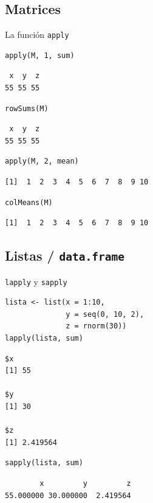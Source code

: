 \documentclass[xcolor={usenames,svgnames,dvipsnames}]{beamer}
\begin{document}
\subsection{Matrices}
\label{sec-4-1}
\begin{frame}[fragile,label=sec-4-1-1]{La función \texttt{apply}}
 \lstset{language=R,label= ,caption= ,numbers=none}
\begin{lstlisting}
apply(M, 1, sum)
\end{lstlisting}

\begin{verbatim}
 x  y  z 
55 55 55
\end{verbatim}

\lstset{language=R,label= ,caption= ,numbers=none}
\begin{lstlisting}
rowSums(M)
\end{lstlisting}

\begin{verbatim}
 x  y  z 
55 55 55
\end{verbatim}

\lstset{language=R,label= ,caption= ,numbers=none}
\begin{lstlisting}
apply(M, 2, mean)
\end{lstlisting}

\begin{verbatim}
[1]  1  2  3  4  5  6  7  8  9 10
\end{verbatim}

\lstset{language=R,label= ,caption= ,numbers=none}
\begin{lstlisting}
colMeans(M)
\end{lstlisting}

\begin{verbatim}
[1]  1  2  3  4  5  6  7  8  9 10
\end{verbatim}
\end{frame}

\subsection{Listas / \texttt{data.frame}}
\label{sec-4-2}
\begin{frame}[fragile,label=sec-4-2-1]{\texttt{lapply} y \texttt{sapply}}
 \lstset{language=R,label= ,caption= ,numbers=none}
\begin{lstlisting}
lista <- list(x = 1:10,
              y = seq(0, 10, 2),
              z = rnorm(30))
lapply(lista, sum)
\end{lstlisting}

\begin{verbatim}
$x
[1] 55

$y
[1] 30

$z
[1] 2.419564
\end{verbatim}

\lstset{language=R,label= ,caption= ,numbers=none}
\begin{lstlisting}
sapply(lista, sum)
\end{lstlisting}

\begin{verbatim}
        x         y         z 
55.000000 30.000000  2.419564
\end{verbatim}
\end{frame}
\end{document}
